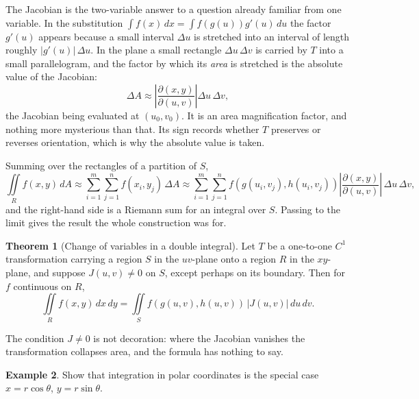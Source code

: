 \documentclass[11pt,a4paper]{article}
\theoremstyle{definition}
\newtheorem{thm}{Theorem}[subsection]
\newtheorem{exa}[thm]{Example}
\begin{document}
The Jacobian is the two-variable answer to a question already familiar from one
variable. In the substitution $\int f(x)\,dx = \int f(g(u))g'(u)\,du$ the factor
$g'(u)$ appears because a small interval $\Delta u$ is stretched into an
interval of length roughly $|g'(u)|\,\Delta u$. In the plane a small rectangle
$\Delta u\,\Delta v$ is carried by $T$ into a small parallelogram, and the
factor by which its \emph{area} is stretched is the absolute value of the
Jacobian:
\[\Delta A \approx \left|\frac{\partial ( x,y)}{\partial (u,v)}\right|
\Delta u\, \Delta v ,\]
the Jacobian being evaluated at $(u_0,v_0)$. It is an area magnification factor,
and nothing more mysterious than that. Its sign records whether $T$ preserves or
reverses orientation, which is why the absolute value is taken.

Summing over the rectangles of a partition of $S$,
\[\iint\limits_R f(x,y)\, dA \approx \sum^m_{i=1}\sum^n_{j = 1} f(x_i , y_j)\,
\Delta A \approx \sum^m_{i=1}\sum^n_{j = 1}f(g(u_i,v_j), h(u_i,v_j))
\left|\frac{\partial ( x,y)}{\partial (u,v)}\right|\, \Delta u \,\Delta v ,\]
and the right-hand side is a Riemann sum for an integral over $S$. Passing to
the limit gives the result the whole construction was for.

\begin{thm}[Change of variables in a double integral]
\label{thm:changevar}
Let $T$ be a one-to-one $C^1$ transformation carrying a region $S$ in the
$uv$-plane onto a region $R$ in the $xy$-plane, and suppose $J(u,v)\neq 0$ on
$S$, except perhaps on its boundary. Then for $f$ continuous on $R$,
\[\iint\limits_R f(x,y)\,dx\,dy = \iint\limits_S f(g(u,v),h(u,v))\,|J(u,v)|\,
du\, dv .\]
\end{thm}

The condition $J\neq 0$ is not decoration: where the Jacobian vanishes the
transformation collapses area, and the formula has nothing to say.

\begin{exa}
\label{ex:polarjacobian}
Show that integration in polar coordinates is the special case
$x = r\cos\theta$, $y = r\sin\theta$.
\end{exa}
\end{document}

